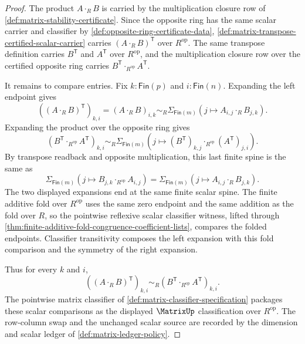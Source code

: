\begin{proof}
The product $A\cdot_RB$ is carried by the multiplication closure row of \autoref{def:matrix-stability-certificate}. Since the opposite ring has the same scalar carrier and classifier by \autoref{def:opposite-ring-certificate-data}, \autoref{def:matrix-transpose-certified-scalar-carrier} carries $(A\cdot_RB)^{\mathsf{T}}$ over $R^{\mathrm{op}}$. The same transpose definition carries $B^{\mathsf{T}}$ and $A^{\mathsf{T}}$ over $R^{\mathrm{op}}$, and the multiplication closure row over the certified opposite ring carries $B^{\mathsf{T}}\cdot_{R^{\mathrm{op}}}A^{\mathsf{T}}$.

It remains to compare entries. Fix $k:\mathsf{Fin}(p)$ and $i:\mathsf{Fin}(n)$. Expanding the left endpoint gives
$$
((A\cdot_RB)^{\mathsf{T}})_{k,i}=(A\cdot_RB)_{i,k}\sim_R\Sigma_{\mathsf{Fin}(m)}(j\mapsto A_{i,j}\cdot_RB_{j,k}).
$$
Expanding the product over the opposite ring gives
$$
(B^{\mathsf{T}}\cdot_{R^{\mathrm{op}}}A^{\mathsf{T}})_{k,i}\sim_R\Sigma_{\mathsf{Fin}(m)}(j\mapsto (B^{\mathsf{T}})_{k,j}\cdot_{R^{\mathrm{op}}}(A^{\mathsf{T}})_{j,i}).
$$
By transpose readback and opposite multiplication, this last finite spine is the same as
$$
\Sigma_{\mathsf{Fin}(m)}(j\mapsto B_{j,k}\cdot_{R^{\mathrm{op}}}A_{i,j})=\Sigma_{\mathsf{Fin}(m)}(j\mapsto A_{i,j}\cdot_RB_{j,k}).
$$
The two displayed expansions end at the same finite scalar spine. The finite additive fold over $R^{\mathrm{op}}$ uses the same zero endpoint and the same addition as the fold over $R$, so the pointwise reflexive scalar classifier witness, lifted through \autoref{thm:finite-additive-fold-congruence-coefficient-lists}, compares the folded endpoints. Classifier transitivity composes the left expansion with this fold comparison and the symmetry of the right expansion.

Thus for every $k$ and $i$,
$$
((A\cdot_RB)^{\mathsf{T}})_{k,i}
\sim_R
(B^{\mathsf{T}}\cdot_{R^{\mathrm{op}}}A^{\mathsf{T}})_{k,i}.
$$
The pointwise matrix classifier of \autoref{def:matrix-classifier-specification} packages these scalar comparisons as the displayed $\MatrixUp$ classification over $R^{\mathrm{op}}$. The row-column swap and the unchanged scalar source are recorded by the dimension and scalar ledger of \autoref{def:matrix-ledger-policy}.
\end{proof}

